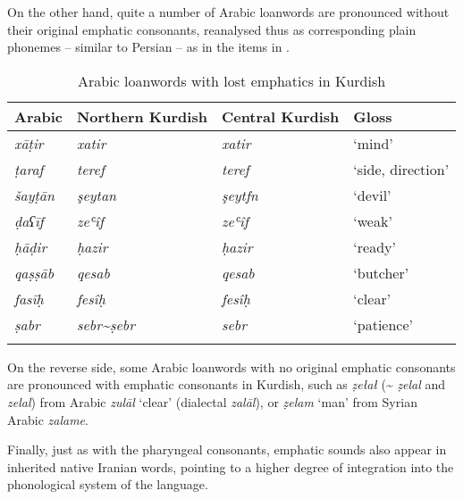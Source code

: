 \documentclass[output=paper]{langsci/langscibook}
\begin{document}
On the other hand, quite a number of Arabic loanwords are pronounced without their original emphatic consonants, reanalysed thus as corresponding plain phonemes – similar to Persian – as in the items in . 

\begin{table}
\begin{tabular}{llll}
\lsptoprule
{Arabic} & {Northern Kurdish} & {Central Kurdish} & {Gloss}\\\midrule
\textit{xāṭir}  & \textit{xatir}                           & \textit{xatir}  & ‘mind’\\
\textit{ṭaraf}  & \textit{teref}                           & \textit{teref}  & ‘side, direction’\\
\textit{šayṭān} & \textit{şeytan}                          & \textit{şeytfn} & ‘devil’\\
\textit{ḍaʕīf}  & \textit{zeʿîf}                           & \textit{zeʿîf}  & ‘weak’\\
\textit{ḥāḍir}  & \textit{ḥazir}                           & \textit{ḥazir}  & ‘ready’  \\
\textit{qaṣṣāb} & \textit{qesab}                           & \textit{qesab}  & ‘butcher’\\
\textit{fasīḥ}  & \textit{fesîḥ}                           & \textit{fesîḥ}  & ‘clear’\\
\textit{ṣabr}   & \textit{sebr{\textasciitilde}ṣebr}       & \textit{sebr}   & ‘patience’\\
\lspbottomrule
\end{tabular}
\caption{\label{bkm:Ref14707500}Arabic loanwords with lost emphatics in Kurdish\label{tab:opengin:6}}
\end{table}

On the reverse side, some Arabic loanwords with no original emphatic consonants are pronounced with emphatic consonants in Kurdish, such as \textit{ẓełał} ({\textasciitilde} \textit{ẓelal} and \textit{zelal}) from Arabic \textit{zulāl} ‘clear’ (dialectal \textit{zalāl}), or \textit{ẓelam} ‘man’ from Syrian Arabic \textit{zalame}.    

Finally, just as with the pharyngeal consonants, emphatic sounds also appear in inherited native Iranian words, pointing to a higher degree of integration into the phonological system of the language. 
\end{document}
